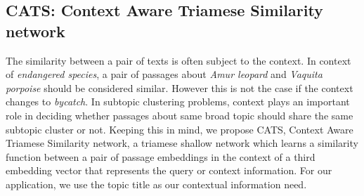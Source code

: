 \subsection{CATS: Context Aware Triamese Similarity network}\label{sec:cats} 
The similarity between a pair of texts is often subject to the context. In context of \textit{endangered species}, a pair of passages about \textit{Amur leopard} and \textit{Vaquita porpoise} should be considered similar. However this is not the case if the context changes to \textit{bycatch}. In subtopic clustering problems, context plays an important role in deciding whether passages about same broad topic should share the same subtopic cluster or not. Keeping this in mind, we propose CATS, Context Aware Triamese Similarity network, a triamese shallow network which learns a similarity function between a pair of passage embeddings in the context of a third embedding vector that represents the query or context information. For our application, we use the topic title as our contextual information need.

